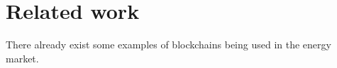 
\section{Related work}
There already exist some examples of blockchains being used in the energy market.  



